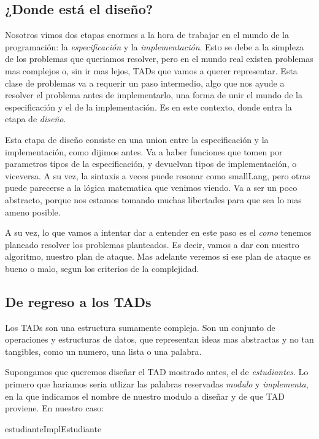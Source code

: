 \documentclass{article}
\begin{document}
\subsection{¿Donde está el diseño?}

Nosotros vimos dos etapas enormes a la hora de trabajar en el mundo de la programación: la \textit{especificación} y la \textit{implementación}. Esto se debe a la simpleza de los problemas que queriamos resolver, pero en el mundo real existen problemas mas complejos o, sin ir mas lejos, TADs que vamos a querer representar. Esta clase de problemas va a requerir un paso intermedio, algo que nos ayude a resolver el problema antes de implementarlo, una forma de unir el mundo de la especificación y el de la implementación. Es en este contexto, donde entra la etapa de \textit{diseño}.

Esta etapa de diseño consiste en una union entre la especificación y la implementación, como dijimos antes. Va a haber funciones que tomen por parametros tipos de la especificación, y devuelvan tipos de implementación, o viceversa. A su vez, la sintaxis a veces puede resonar como smallLang, pero otras puede parecerse a la lógica matematica que venimos viendo. Va a ser un poco abstracto, porque nos estamos tomando muchas libertades para que sea lo mas ameno posible.

A su vez, lo que vamos a intentar dar a entender en este paso es el \textit{como} tenemos planeado resolver los problemas planteados. Es decir, vamos a dar con nuestro algoritmo, nuestro plan de ataque. Mas adelante veremos si ese plan de ataque es bueno o malo, segun los criterios de la complejidad.

\subsection{De regreso a los TADs}

Los TADs son una estructura sumamente compleja. Son un conjunto de operaciones y estructuras de datos, que representan ideas mas abstractas y no tan tangibles, como un numero, una lista o una palabra.

Supongamos que queremos diseñar el TAD mostrado antes, el de \textit{estudiantes}. Lo primero que hariamos seria utlizar las palabras reservadas \textit{modulo} y \textit{implementa}, en la que indicamos el nombre de nuestro modulo a diseñar y de que TAD proviene. En nuestro caso:

\begin{modulo}{estudianteImpl}{Estudiante}
	 \\
	 \\
\end{modulo}
\end{document}
